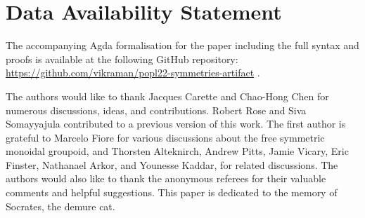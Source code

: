 \documentclass[acmsmall,screen]{acmart}
\begin{document}

\renewcommand{\appendixsectionformat}[2]{
  {Supplementary material for Section~#1}
}










\section*{Data Availability Statement}

The accompanying Agda formalisation for the paper including the full syntax and proofs is available at the following
GitHub repository:
\url{https://github.com/vikraman/popl22-symmetries-artifact}
\cite*{choudhuryArtifactSymmetriesReversible2021}.

\begin{acks}
  The authors would like to thank Jacques Carette and Chao-Hong Chen for numerous discussions, ideas, and contributions.
  Robert Rose and Siva Somayyajula contributed to a previous version of this work. The first author is grateful to
  Marcelo Fiore for various discussions about the free symmetric monoidal groupoid, and Thorsten Alteknirch, Andrew
  Pitts, Jamie Vicary, Eric Finster, Nathanael Arkor, and Younesse Kaddar, for related discussions. The authors would
  also like to thank the anonymous referees for their valuable comments and helpful suggestions. This paper is dedicated
  to the memory of Socrates, the demure cat.
\end{acks}



\end{document}
